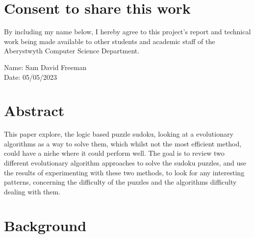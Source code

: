 \documentclass[a4paper,11pt]{article}
\begin{document}
\vspace{1em}
\section*{\centering Consent to share this work}

By including my name below, I hereby agree to this project's report and technical work being made available to other students and academic staff of the Aberystwyth Computer Science Department.  

\vspace{2em}
Name: Sam David Freeman  \\

\vspace{1em}
Date: 05/05/2023 \\
\newpage
\section*{\centering Abstract}
This paper explore, the logic based puzzle sudoku, looking at a evolutionary algorithms as a way to solve them, which whilst not the most efficient method, could have a niche where it could perform well. The goal is to review two different evolutionary algorithm approaches to solve the sudoku puzzles, and use the results of experimenting with these two methods, to look for any interesting patterns, concerning the difficulty of the puzzles and the algorithms difficulty dealing with them.
\newpage
\tableofcontents
\newpage
\section{Background}
\end{document}
